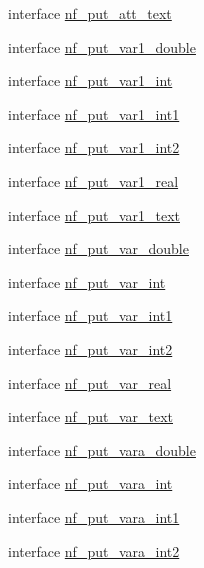 \begin{DoxyCompactItemize}
\item 
interface \hyperlink{interfacenetcdf__nf__interfaces_1_1nf__put__att__text}{nf\+\_\+put\+\_\+att\+\_\+text}
\item 
interface \hyperlink{interfacenetcdf__nf__interfaces_1_1nf__put__var1__double}{nf\+\_\+put\+\_\+var1\+\_\+double}
\item 
interface \hyperlink{interfacenetcdf__nf__interfaces_1_1nf__put__var1__int}{nf\+\_\+put\+\_\+var1\+\_\+int}
\item 
interface \hyperlink{interfacenetcdf__nf__interfaces_1_1nf__put__var1__int1}{nf\+\_\+put\+\_\+var1\+\_\+int1}
\item 
interface \hyperlink{interfacenetcdf__nf__interfaces_1_1nf__put__var1__int2}{nf\+\_\+put\+\_\+var1\+\_\+int2}
\item 
interface \hyperlink{interfacenetcdf__nf__interfaces_1_1nf__put__var1__real}{nf\+\_\+put\+\_\+var1\+\_\+real}
\item 
interface \hyperlink{interfacenetcdf__nf__interfaces_1_1nf__put__var1__text}{nf\+\_\+put\+\_\+var1\+\_\+text}
\item 
interface \hyperlink{interfacenetcdf__nf__interfaces_1_1nf__put__var__double}{nf\+\_\+put\+\_\+var\+\_\+double}
\item 
interface \hyperlink{interfacenetcdf__nf__interfaces_1_1nf__put__var__int}{nf\+\_\+put\+\_\+var\+\_\+int}
\item 
interface \hyperlink{interfacenetcdf__nf__interfaces_1_1nf__put__var__int1}{nf\+\_\+put\+\_\+var\+\_\+int1}
\item 
interface \hyperlink{interfacenetcdf__nf__interfaces_1_1nf__put__var__int2}{nf\+\_\+put\+\_\+var\+\_\+int2}
\item 
interface \hyperlink{interfacenetcdf__nf__interfaces_1_1nf__put__var__real}{nf\+\_\+put\+\_\+var\+\_\+real}
\item 
interface \hyperlink{interfacenetcdf__nf__interfaces_1_1nf__put__var__text}{nf\+\_\+put\+\_\+var\+\_\+text}
\item 
interface \hyperlink{interfacenetcdf__nf__interfaces_1_1nf__put__vara__double}{nf\+\_\+put\+\_\+vara\+\_\+double}
\item 
interface \hyperlink{interfacenetcdf__nf__interfaces_1_1nf__put__vara__int}{nf\+\_\+put\+\_\+vara\+\_\+int}
\item 
interface \hyperlink{interfacenetcdf__nf__interfaces_1_1nf__put__vara__int1}{nf\+\_\+put\+\_\+vara\+\_\+int1}
\item 
interface \hyperlink{interfacenetcdf__nf__interfaces_1_1nf__put__vara__int2}{nf\+\_\+put\+\_\+vara\+\_\+int2}

\end{DoxyCompactItemize}
